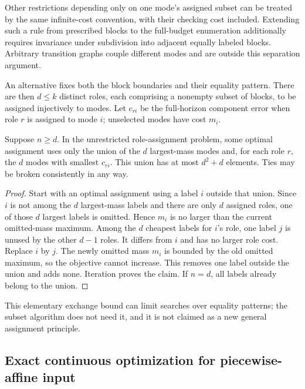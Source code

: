 Other restrictions depending only on one mode's assigned subset can be
treated by the same infinite-cost convention, with their checking cost
included. Extending such a rule from prescribed blocks to the full-budget
enumeration additionally requires invariance under subdivision into adjacent
equally labeled blocks. Arbitrary transition graphs couple different modes
and are outside this separation argument.

An alternative fixes both the block boundaries and their equality pattern.
There are then $d\le k$ distinct roles, each comprising a nonempty subset
of blocks, to be assigned injectively to modes. Let $c_{ri}$ be the
full-horizon component error when role $r$ is assigned to mode $i$;
unselected modes have cost $m_i$.

\begin{lemma}\label{lem:candidate-labels}
Suppose $n\ge d$. In the unrestricted role-assignment problem, some optimal
assignment uses only the union of the $d$ largest-mass modes and, for each
role $r$, the $d$ modes with smallest $c_{ri}$. This union has at most
$d^2+d$ elements. Ties may be broken consistently in any way.
\end{lemma}
\begin{proof}
Start with an optimal assignment using a label $i$ outside that union. Since
$i$ is not among the $d$ largest-mass labels and there are only $d$ assigned
roles, one of those $d$ largest labels is omitted. Hence $m_i$ is no larger
than the current omitted-mass maximum. Among the $d$ cheapest labels for
$i$'s role, one label $j$ is unused by the other $d-1$ roles. It differs
from $i$ and has no larger role cost. Replace $i$ by $j$. The newly omitted
mass $m_i$ is bounded by the old omitted maximum, so the objective cannot
increase. This removes one label outside the union and adds none. Iteration
proves the claim. If $n=d$, all labels already belong to the union.
\end{proof}
This elementary exchange bound can limit searches over equality patterns;
the subset algorithm does not need it, and it is not claimed as a new
general assignment principle.

\subsection{Exact continuous optimization for piecewise-affine input}

